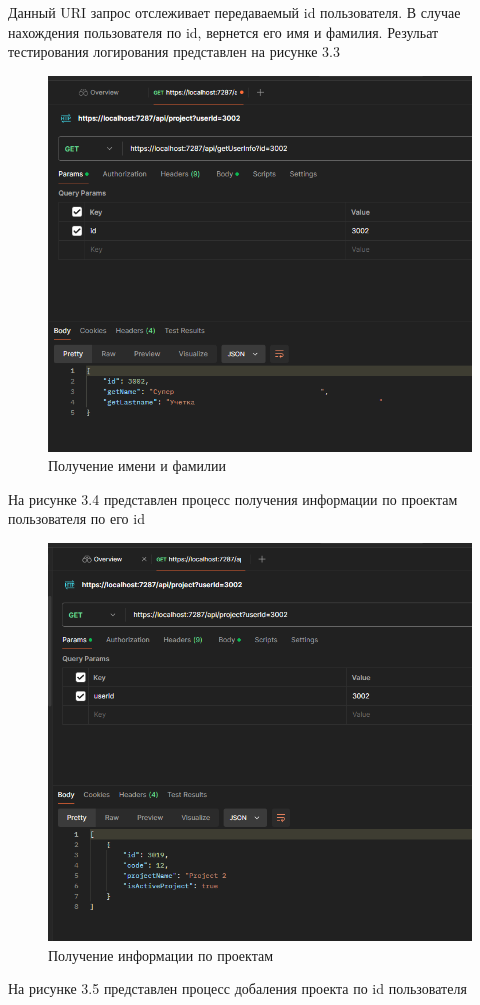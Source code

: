 Данный URI запрос отслеживает передаваемый id пользователя. В случае нахождения пользователя по id, вернется его имя и фамилия. Резульат тестирования логирования представлен на рисунке 3.3

\begin{figure}[H]
	\centering
	\includegraphics[width=0.7\linewidth]{images/LoginNameLastname}
	\caption{Получение имени и фамилии}
	\label{fig:loginnamelastname}
\end{figure}

На рисунке 3.4 представлен процесс получения информации по проектам пользователя по его id

\begin{figure}[H]
	\centering
	\includegraphics[width=0.6\linewidth]{images/TestGetProject}
	\caption{Получение информации по проектам}
	\label{fig:testgetproject}
\end{figure}

На рисунке 3.5 представлен процесс добаления проекта по id пользователя

